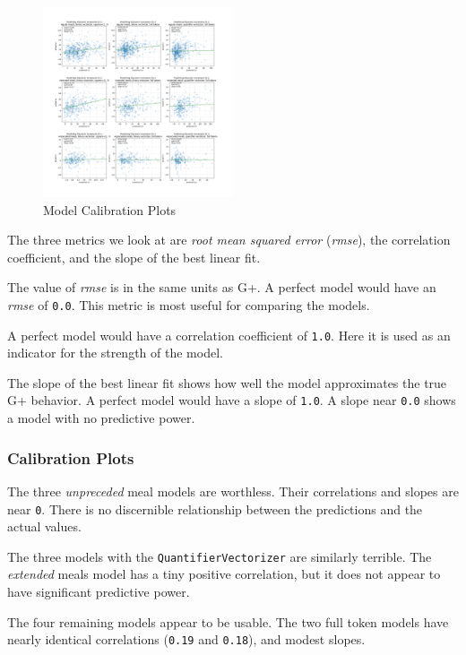 \documentclass[conference]{IEEEtran}
\begin{document}
\begin{figure}[tbp]
    \includegraphics[width=0.5\textwidth]{images/gplus_all_models.png}
    \caption{Model Calibration Plots}
    \label{fig:all_models_tested}
\end{figure}

The three metrics we look at are \emph{root mean squared error} (\emph{rmse}), the correlation coefficient, and the slope of the best linear fit.

The value of \emph{rmse} is in the same units as G+. A perfect model would have an \emph{rmse} of \texttt{0.0}. This metric is most useful for comparing the models.

A perfect model would have a correlation coefficient of \texttt{1.0}. Here it is used as an indicator for the strength of the model.

The slope of the best linear fit shows how well the model approximates the true G+ behavior. A perfect model would have a slope of \texttt{1.0}. A slope near \texttt{0.0} shows a model with no predictive power.

\subsubsection{Calibration Plots}

The three \emph{unpreceded} meal models are worthless. Their correlations and slopes are near \texttt{0}. There is no discernible relationship between the predictions and the actual values.

The three models with the \texttt{QuantifierVectorizer} are similarly terrible. The \emph{extended} meals model has a tiny positive correlation, but it does not appear to have significant predictive power.

The four remaining models appear to be usable. The two full token models have nearly identical correlations (\texttt{0.19} and \texttt{0.18}), and modest slopes.
\end{document}
